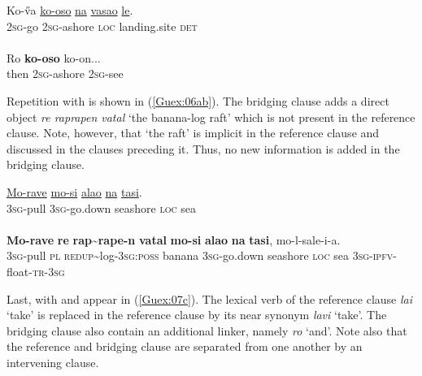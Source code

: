 \documentclass[output=paper]{LSP/langsci}
\begin{document}
\begin{exe}
\ex \label{Guex:05ab}
\begin{xlist}
\ex \label{Guex:05a}
\gll Ko-\H{v}a    \underline{ko-oso}         \underline{na}     \underline{vasao}          \underline{le}.\\
\textsc{2sg}-go   \textsc{2sg}-ashore   \textsc{loc}    landing.site   \textsc{det}\\
\glt {}\\
\ex \label{Guex:05b}
\gll Ro \textbf{ko-oso}        ko-on...\\     	       
    then   \textsc{2sg}-ashore   \textsc{2sg}-see \\
\glt {} 
\end{xlist}
\end{exe}


Repetition with  is shown in (\ref{Guex:06ab}). The bridging clause adds a direct object \textit{re raprapen vatal} `the banana-log raft' which is not present in the reference clause. Note, however, that `the raft' is implicit in the reference clause and discussed in the clauses preceding it. Thus, no new information is added in the bridging clause.

\begin{exe}
\ex \label{Guex:06ab}
\begin{xlist}
\ex \label{Guex:06a}
\gll \underline{Mo-rave}   \underline{mo-si}    \underline{alao}    \underline{na}  \underline{tasi}.\\
\textsc{3sg}-pull    \textsc{3sg}-go.down  seashore  \textsc{loc}  sea\\
\glt {}\\
\ex \label{Guex:06b}
\gll \textbf{Mo-rave}  \textbf{re}  \textbf{rap{\textasciitilde}rape-n}    \textbf{vatal}        \textbf{mo-si} \textbf{alao}    \textbf{na}  \textbf{tasi}, mo-l-sale-i-a.\\     	       
\textsc{3sg}-pull  \textsc{pl}  \textsc{redup}{\textasciitilde}log-\textsc{3sg:poss} banana  \textsc{3sg}-go.down  seashore \textsc{loc} sea  \textsc{3sg-ipfv}-float-\textsc{tr-3sg} \\
\glt {} 
\end{xlist}
\end{exe}

Last,  with  and  appear in (\ref{Guex:07c}). The lexical verb of the reference clause \textit{lai} `take' is replaced in the reference clause by its near synonym \textit{lavi} `take'. The bridging clause also contain an additional linker, namely \textit{ro} `and'.  Note also that the reference and bridging clause are separated from one another by an intervening clause.
\end{document}
